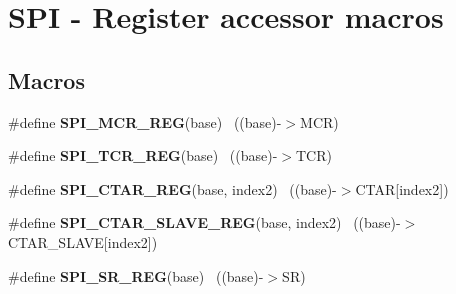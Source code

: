 \hypertarget{group___s_p_i___register___accessor___macros}{}\section{S\+P\+I -\/ Register accessor macros}
\label{group___s_p_i___register___accessor___macros}
\subsection*{Macros}
\begin{DoxyCompactItemize}
\item 
\hypertarget{group___s_p_i___register___accessor___macros_gae54fdee07e5ec098efe6da63f34f2ecd}{}\#define {\bfseries S\+P\+I\+\_\+\+M\+C\+R\+\_\+\+R\+E\+G}(base)                                            ~((base)-\/$>$M\+C\+R)\label{group___s_p_i___register___accessor___macros_gae54fdee07e5ec098efe6da63f34f2ecd}

\item 
\hypertarget{group___s_p_i___register___accessor___macros_gac7b659989db7f592b223186299d8535e}{}\#define {\bfseries S\+P\+I\+\_\+\+T\+C\+R\+\_\+\+R\+E\+G}(base)                                            ~((base)-\/$>$T\+C\+R)\label{group___s_p_i___register___accessor___macros_gac7b659989db7f592b223186299d8535e}

\item 
\hypertarget{group___s_p_i___register___accessor___macros_ga5ab762c9000b796d14c1ce822eefc436}{}\#define {\bfseries S\+P\+I\+\_\+\+C\+T\+A\+R\+\_\+\+R\+E\+G}(base,  index2)                            ~((base)-\/$>$C\+T\+A\+R\mbox{[}index2\mbox{]})\label{group___s_p_i___register___accessor___macros_ga5ab762c9000b796d14c1ce822eefc436}

\item 
\hypertarget{group___s_p_i___register___accessor___macros_ga2025336cecfcf0c5b7cdb30e8056505b}{}\#define {\bfseries S\+P\+I\+\_\+\+C\+T\+A\+R\+\_\+\+S\+L\+A\+V\+E\+\_\+\+R\+E\+G}(base,  index2)                ~((base)-\/$>$C\+T\+A\+R\+\_\+\+S\+L\+A\+V\+E\mbox{[}index2\mbox{]})\label{group___s_p_i___register___accessor___macros_ga2025336cecfcf0c5b7cdb30e8056505b}

\item 
\hypertarget{group___s_p_i___register___accessor___macros_ga0621f5a9016db52860125b33dd3519a2}{}\#define {\bfseries S\+P\+I\+\_\+\+S\+R\+\_\+\+R\+E\+G}(base)                                              ~((base)-\/$>$S\+R)\label{group___s_p_i___register___accessor___macros_ga0621f5a9016db52860125b33dd3519a2}


\end{DoxyCompactItemize}
